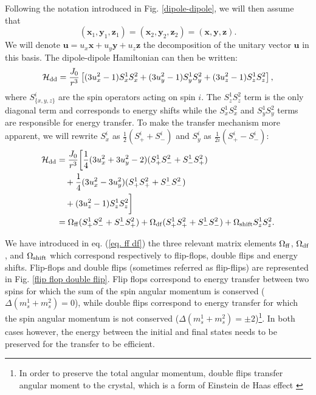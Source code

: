 \documentclass[a4paper,11pt]{report}
\begin{document}
\begin{refsection}
Following the notation introduced in Fig. \ref{dipole-dipole}, we will then assume that $$(\mathbf{x}_1,\mathbf{y}_1,\mathbf{z}_1) = (\mathbf{x}_2,\mathbf{y}_2,\mathbf{z}_2) = (\mathbf{x},\mathbf{y},\mathbf{z}).$$ We will denote $\mathbf{u}=u_x \mathbf{x} + u_y \mathbf{y} + u_z \mathbf{z}$ the decomposition of the unitary vector $\mathbf{u}$ in this basis. The dipole-dipole Hamiltonian can then be written:
\begin{equation}
\mathcal{H}_{\rm dd}=\frac{J_0}{r^3}\left[ (3 u_x^2-1) S_x^1 S_x^2 + (3 u_y^2-1) S_y^1 S_y^2 + (3 u_z^2-1) S_z^1 S_z^2 \right],
\end{equation}
where $S_{\{x,y,z\} }^i$ are the spin operators acting on spin $i$. The $S_z^1 S_z^2$ term is the only diagonal term and corresponds to energy shifts while the $S_x^1 S_x^2$ and $S_y^1 S_y^2$ terms are responsible for energy transfer. To make the transfer mechanism more apparent, we will rewrite $S_x^i$ as $\frac{1}{2}(S_+^i+S_-^i)$ and $S_y^i$ as $\frac{1}{2i}(S_+^i-S_-^i)$:
\begin{align}
\mathcal{H}_{\rm dd}&=\frac{J_0}{r^3}\bigg{[} \frac{1}{4}(3 u_x^2 + 3 u_y^2 -2)(S_+^1 S_-^2 + S_-^1 S_+^2) \nonumber \\
&\quad + \frac{1}{4}(3 u_x^2 - 3 u_y^2)(S_+^1 S_+^2 + S_-^1 S_-^2) \nonumber \\
&\quad +(3 u_z^2-1) S_z^1 S_z^2 \bigg{]} \nonumber \\
\medskip
&= \Omega_{\rm ff} (S_+^1 S_-^2 + S_-^1 S_+^2) + \Omega_{\rm df} (S_+^1 S_+^2 + S_-^1 S_-^2) + \Omega_{\rm shift} S_z^1 S_z^2. \label{eq. ff df}
\end{align}

We have introduced in eq. (\ref{eq. ff df}) the three relevant matrix elements $\Omega_{\rm ff}$, $\Omega_{\rm df}$, and $\Omega_{\rm shift}$ which correspond respectively to flip-flops, double flips and energy shifts. Flip-flops and double flips (sometimes referred as flip-flips) are represented in Fig. \ref{flip flop double flip}. Flip flops correspond to energy transfer between two spins for which the sum of the spin angular momentum is conserved ($\Delta (m_s^1+m_s^2)=0$), while double flips correspond to energy transfer for which the spin angular momentum is not conserved ($\Delta (m_s^1+m_s^2)=\pm 2$)\footnote{In order to preserve the total angular momentum, double flips transfer angular moment to the crystal, which is a form of Einstein de Haas effect \citep{einstein1915experimental} }. In both cases however, the energy between the initial and final states needs to be preserved for the transfer to be efficient. 


\end{refsection}
\end{document}

